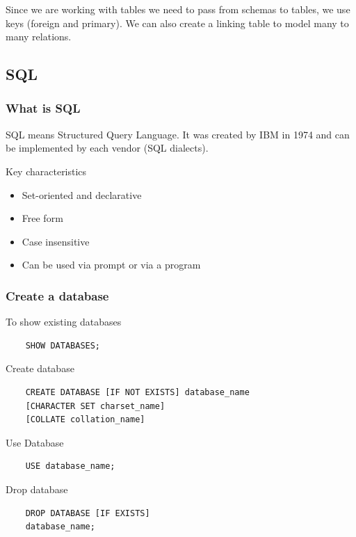 Since we are working with tables we need to pass from schemas to tables, we use keys (foreign and primary).
We can also create a linking table to model many to many relations.

\subsection{SQL}

\subsubsection{What is SQL}

SQL means Structured Query Language. It was created by IBM in 1974 and can be implemented by each vendor (SQL dialects). 

\vspace{10pt}

Key characteristics

\begin{itemize}
    \item Set-oriented and declarative
    \item Free form
    \item Case insensitive
    \item Can be used via prompt or via a program
\end{itemize}

\subsubsection{Create a database}

To show existing databases

\begin{verbatim}
    SHOW DATABASES;
\end{verbatim}

Create database

\begin{verbatim}
    CREATE DATABASE [IF NOT EXISTS] database_name
    [CHARACTER SET charset_name]
    [COLLATE collation_name]
\end{verbatim}

Use Database
\begin{verbatim}
    USE database_name;
\end{verbatim}

Drop database
\begin{verbatim}
    DROP DATABASE [IF EXISTS]
    database_name;
\end{verbatim}

